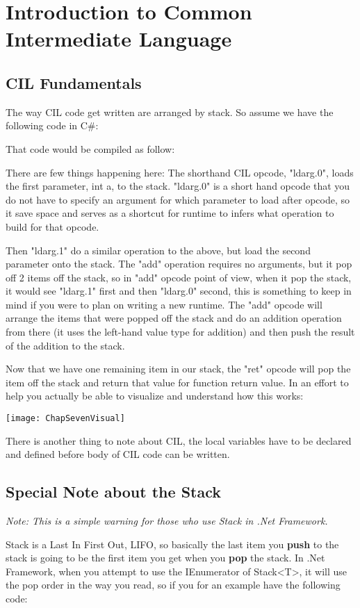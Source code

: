 \chapter{Introduction to Common Intermediate Language}
\section{CIL Fundamentals}
The way CIL code get written are arranged by stack. So assume we have the following code in C\#:

That code would be compiled as follow:


There are few things happening here:
The shorthand CIL opcode, "ldarg.0", loads the first parameter, int a, to the stack. "ldarg.0" is a short hand opcode that you do not have to specify an argument for which parameter to load after opcode, so it save space and serves as a shortcut for runtime to infers what operation to build for that opcode.

Then "ldarg.1" do a similar operation to the above, but load the second parameter onto the stack. The "add" operation requires no arguments, but it pop off 2 items off the stack, so in "add" opcode point of view, when it pop the stack, it would see "ldarg.1" first and then "ldarg.0" second, this is something to keep in mind if you were to plan on writing a new runtime. The "add" opcode will arrange the items that were popped off the stack and do an addition operation from there (it uses the left-hand value type for addition) and then push the result of the addition to the stack.

Now that we have one remaining item in our stack, the "ret" opcode will pop the item off the stack and return that value for function return value.
\newpage
In an effort to help you actually be able to visualize and understand how this works:

\texttt{[image: ChapSevenVisual]}

There is another thing to note about CIL, the local variables have to be declared and defined before body of CIL code can be written.

\section{Special Note about the Stack}
\textit{Note: This is a simple warning for those who use Stack in .Net Framework.}

Stack is a Last In First Out, LIFO, so basically the last item you \textbf{push} to the stack is going to be the first item you get when you \textbf{pop} the stack. In .Net Framework, when you attempt to use the IEnumerator of Stack<T>, it will use the pop order in the way you read, so if you for an example have the following code:

